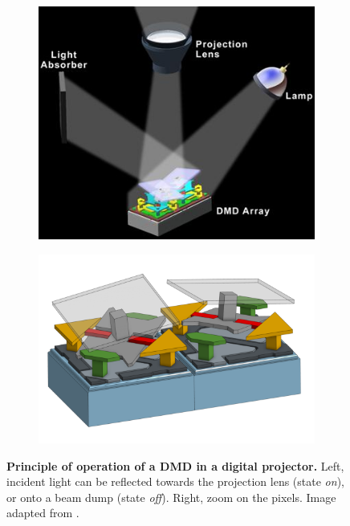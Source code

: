 \documentclass[12pt]{iopart}
\begin{document}
\begin{figure}
  \centering
  \begin{subfigure}{0.49\textwidth}
    \centering
    \includegraphics[width = \textwidth]{images/pixel_1.jpg}
    \label{fig:pix_left}
  \end{subfigure}
  \begin{subfigure}{0.49\textwidth}
    \centering
    \includegraphics[width = \textwidth]{images/pixel_2.png}
    \label{fig:pix_right}
  \end{subfigure}
  \caption{
    \textbf{Principle of operation of a DMD in a digital projector.}
    Left, incident light can be reflected towards the projection lens (state {\em on}),
    or onto a beam dump (state {\em off}).
    Right, zoom on the pixels.
    Image adapted from \cite{JacksonDMD}.
  }
  \label{fig:combined_pixel}
\end{figure}
\end{document}
